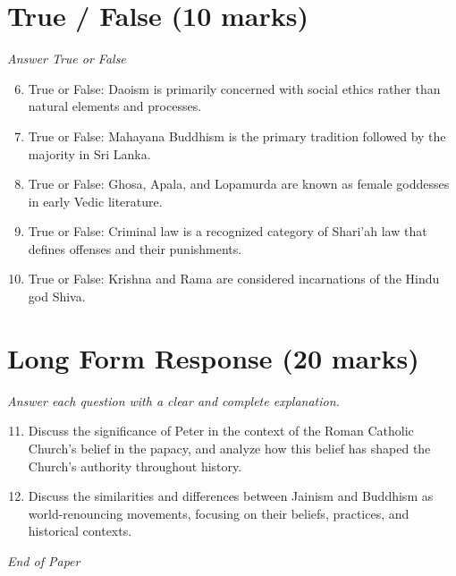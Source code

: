 \documentclass[12pt]{article}
\begin{document}
\section*{True / False (10 marks)}
\textit{Answer True or False}
\begin{enumerate}[label=\arabic*.]
\setcounter{enumi}{5}
\item True or False: Daoism is primarily concerned with social ethics rather than natural elements and processes.
\item True or False: Mahayana Buddhism is the primary tradition followed by the majority in Sri Lanka.
\item True or False: Ghosa, Apala, and Lopamurda are known as female goddesses in early Vedic literature.
\item True or False: Criminal law is a recognized category of Shari'ah law that defines offenses and their punishments.
\item True or False: Krishna and Rama are considered incarnations of the Hindu god Shiva.
\end{enumerate}

\section*{Long Form Response (20 marks)}
\textit{Answer each question with a clear and complete explanation.}
\begin{enumerate}[label=\arabic*.]
\setcounter{enumi}{10}
\item Discuss the significance of Peter in the context of the Roman Catholic Church's belief in the papacy, and analyze how this belief has shaped the Church's authority throughout history.
\item Discuss the similarities and differences between Jainism and Buddhism as world-renouncing movements, focusing on their beliefs, practices, and historical contexts.
\end{enumerate}

\vfill
\noindent\textit{End of Paper}
\end{document}

